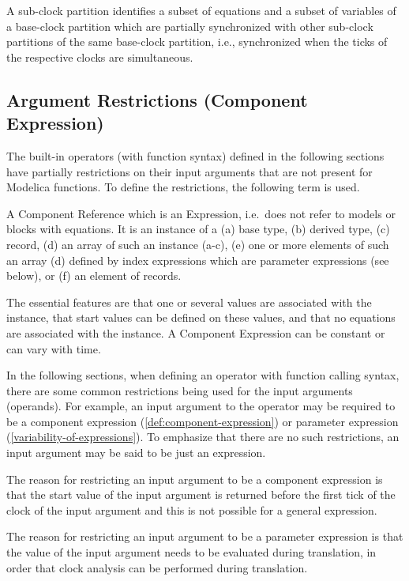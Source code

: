 \begin{definition}
A sub-clock partition identifies a subset of equations and a subset of variables of a base-clock partition which are partially synchronized with other sub-clock partitions of the same base-clock
partition, i.e., synchronized when the ticks of the respective clocks are simultaneous.
\end{definition}

\subsection{Argument Restrictions (Component Expression)}\label{argument-restrictions-component-expression}

The built-in operators (with function syntax) defined in the following
sections have partially restrictions on their input arguments that are
not present for Modelica functions. To define the restrictions, the
following term is used.

\begin{definition}\label{def:component-expression}
A Component Reference which is an Expression, i.e.\ does not refer to models or blocks with equations.  It is an instance of a (a) base type, (b) derived type, (c) record, (d) an array of such an
instance (a-c), (e) one or more elements of such an array (d) defined by index expressions which are parameter expressions (see below), or (f) an element of records.
\begin{nonnormative}
The essential features are that one or several values are associated with the instance, that start values can be defined on these values, and that no equations are associated with the instance.
A Component Expression can be constant or can vary with time.
\end{nonnormative}
\end{definition}

In the following sections, when defining an operator with function calling syntax, there are some common restrictions being used for the input arguments (operands).  For example, an input argument to the operator may be required to be a component expression (\cref{def:component-expression}) or parameter expression (\cref{variability-of-expressions}).  To emphasize that there are no such restrictions, an input argument may be said to be just an expression.

\begin{nonnormative}
The reason for restricting an input argument to be a component expression is that the start value of the input argument is returned before the first tick of the clock of the input argument and this
is not possible for a general expression.

The reason for restricting an input argument to be a parameter expression is that the value of the input argument needs to be evaluated during translation, in order that clock analysis can be performed during translation.
\end{nonnormative}

